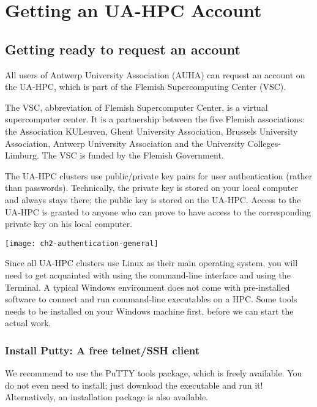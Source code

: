 \chapter{Getting an UA-HPC Account}
\label{ch:getting-a-hpc-account}

\section{Getting ready to request an account}
\label{sec:getting-ready-to-request-an-account}

All users of Antwerp University Association (AUHA) can request an account on
the UA-HPC, which is part of the Flemish Supercomputing Center (VSC).

The VSC, abbreviation of Flemish Supercomputer Center, is a virtual
supercomputer center. It is a partnership between the five Flemish
associations: the Association KULeuven,  Ghent University Association, Brussels
University Association, Antwerp University Association and the University
Colleges-Limburg. The VSC is funded by the Flemish Government.

The UA-HPC clusters use public/private key pairs for user authentication
(rather than passwords). Technically, the private key is stored on your local
computer and always stays there; the public key is stored on the UA-HPC.
Access to the UA-HPC is granted to anyone who can prove to have access to the
corresponding private key on his local computer.

\texttt{[image: ch2-authentication-general]}

\ifwindows

  Since all UA-HPC clusters use Linux as their main operating system, you will
  need to get acquainted with using the command-line interface and using the
  Terminal. A typical Windows environment does not come with pre-installed
  software to connect and run command-line executables on a HPC. Some tools
  needs to be installed on your Windows machine first, before we can start the
  actual work.

  \subsection{Install Putty: A free telnet/SSH client}
  \label{sec:install-putty}

  We recommend to use the PuTTY tools package, which is freely available. You
  do not even need to install; just download the executable and run it!
  Alternatively, an installation package is also available.

